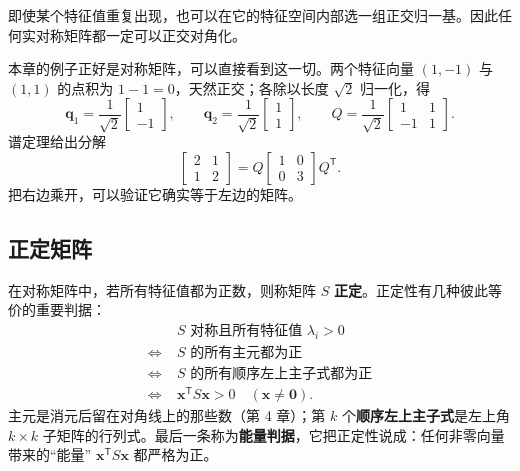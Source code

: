 \documentclass[UTF8,a4paper,12pt]{ctexart}
\numberwithin{equation}{section}
\newcommand{\trans}{^{\mathsf T}}
\begin{document}
	即使某个特征值重复出现，也可以在它的特征空间内部选一组正交归一基。因此任何实对称矩阵都一定可以正交对角化。

	本章的例子正好是对称矩阵，可以直接看到这一切。两个特征向量 $(1,-1)$ 与 $(1,1)$ 的点积为 $1-1=0$，天然正交；各除以长度 $\sqrt{2}$ 归一化，得
	\begin{equation}\label{eq:7.67}
	\bm{q}_1=\frac{1}{\sqrt{2}}
	\begin{bmatrix}
		1\\
		-1
	\end{bmatrix},
	\qquad
	\bm{q}_2=\frac{1}{\sqrt{2}}
	\begin{bmatrix}
		1\\
		1
	\end{bmatrix},
	\qquad
	Q=\frac{1}{\sqrt{2}}
	\begin{bmatrix}
		1&1\\
		-1&1
	\end{bmatrix}.
	\end{equation}
	谱定理给出分解
	\begin{equation}\label{eq:7.68}
	\begin{bmatrix}
		2&1\\
		1&2
	\end{bmatrix}
	=Q
	\begin{bmatrix}
		1&0\\
		0&3
	\end{bmatrix}
	Q\trans.
	\end{equation}
	把右边乘开，可以验证它确实等于左边的矩阵。

	\subsection{正定矩阵}

	在对称矩阵中，若所有特征值都为正数，则称矩阵 $S$ \textbf{正定}。正定性有几种彼此等价的重要判据：
	\begin{equation}\label{eq:7.69}
	\boxed{
		\begin{aligned}
			&S\text{ 对称且所有特征值 }\lambda_i>0\\
			\Longleftrightarrow\;&S\text{ 的所有主元都为正}\\
			\Longleftrightarrow\;&S\text{ 的所有顺序左上主子式都为正}\\
			\Longleftrightarrow\;&\bm{x}\trans S\bm{x}>0\quad(\bm{x}\neq\bm{0}).
		\end{aligned}}
	\end{equation}
	主元是消元后留在对角线上的那些数（第 4 章）；第 $k$ 个\textbf{顺序左上主子式}是左上角 $k\times k$ 子矩阵的行列式。最后一条称为\textbf{能量判据}，它把正定性说成：任何非零向量带来的“能量” $\bm{x}\trans S\bm{x}$ 都严格为正。
\end{document}
